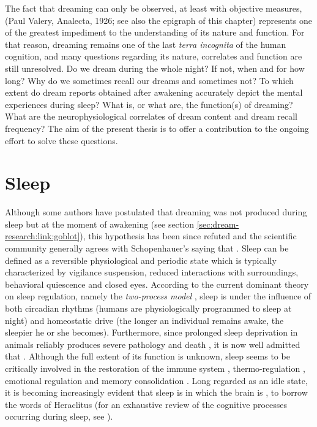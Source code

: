 The fact that dreaming can only be observed, at least with objective measures,  (Paul Valery, Analecta, 1926; see also the epigraph of this chapter) represents one of the greatest impediment to the understanding of its nature and function. For that reason, dreaming remains one of the last \emph{terra incognita} of the human cognition, and many questions regarding its nature, correlates and function are still unresolved. Do we dream during the whole night? If not, when and for how long? Why do we sometimes recall our dreams and sometimes not? To which extent do dream reports obtained after awakening accurately depict the mental experiences during sleep? What is, or what are, the function(s) of dreaming? What are the neurophysiological correlates of dream content and dream recall frequency? The aim of the present thesis is to offer a contribution to the ongoing effort to solve these questions.

\section{Sleep}
\label{sec:dream-research:sleep}

Although some authors have postulated that dreaming was not produced during sleep but at the moment of awakening (see section \ref{sec:dream-research:link:goblot}), this hypothesis has been since refuted and the scientific community generally agrees with Schopenhauer's saying that . Sleep can be defined as a reversible physiological and periodic state which is typically characterized by vigilance suspension, reduced interactions with surroundings, behavioral quiescence and closed eyes. According to the current dominant theory on sleep regulation, namely the \emph{two-process model} \citep{borbely_two_1982}, sleep is under the influence of both circadian rhythms (humans are physiologically programmed to sleep at night) and homeostatic drive (the longer an individual remains awake, the sleepier he or she becomes). Furthermore, since prolonged sleep deprivation in animals reliably produces severe pathology and death \citep{rechtschaffen_physiological_1983, rechtschaffen_sleep_1989}, it is now well admitted that  \citep{tononi_sleep_2014}. Although the full extent of its function is unknown, sleep seems to be critically involved in the restoration of the immune system \citep{bryant_sick_2004}, thermo-regulation \citep{krueger_thermoregulation_1997}, emotional regulation \citep{goldstein_role_2014} and memory consolidation \citep{diekelmann_memory_2010}. Long regarded as an idle state, it is becoming increasingly evident that sleep is  \citep{hirshkowitz_normal_2004} in which the brain is , to borrow the words of Heraclitus (for an exhaustive review of the cognitive processes occurring during sleep, see \citealp{andrillon_sleeping_2016}).

